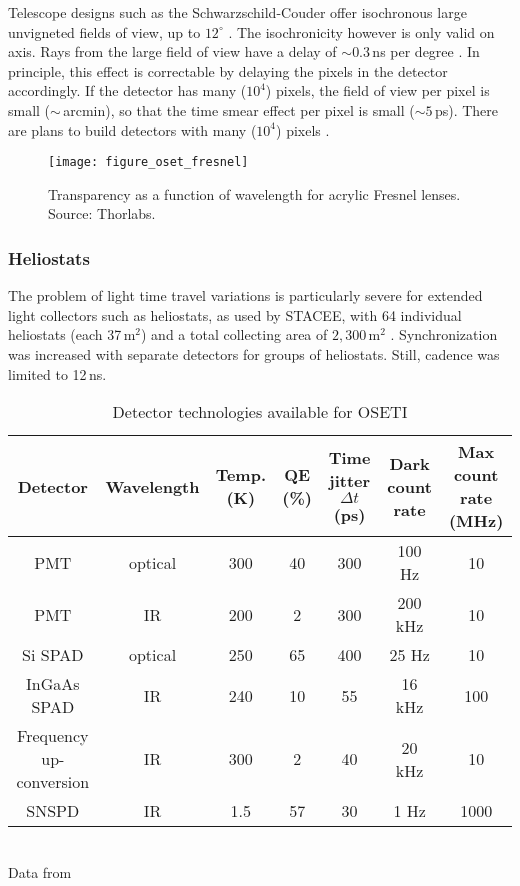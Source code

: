 \documentclass[twocolumn,tighten,longauthor]{myaastex62}
\begin{document}
Telescope designs such as the Schwarzschild-Couder \citep{1905MiGoe..10....1S} offer isochronous large unvigneted fields of view, up to $12^{\circ}$ \citep{Vassiliev2007,2008ICRC....3.1445V}. The isochronicity however is only valid on axis. Rays from the large field of view have a delay of $\sim0.3\,$ns per degree \citep[Figure 10 from][]{2007APh....28...10V}. In principle, this effect is correctable by delaying the pixels in the detector accordingly. If the detector has many ($10^4$) pixels, the field of view per pixel is small ($\sim$\,arcmin), so that the time smear effect per pixel is small ($\sim5\,$ps). There are plans to build detectors with many ($10^4$) pixels \citep{2011ExA....32..193A,2013APh....43....3A,2018arXiv180205715D}.


\begin{figure}
\texttt{[image: figure\_oset\_fresnel]}
\caption{\label{figure_oset_fresnel}Transparency as a function of wavelength for acrylic Fresnel lenses. Source: Thorlabs.}
\end{figure}

\subsubsection{Heliostats}
\label{sub:heliostats}
The problem of light time travel variations is particularly severe for extended light collectors such as heliostats, as used by STACEE, with 64 individual heliostats (each 37\,m$^2$) and a total collecting area of $2{,}300\,$m$^2$ \citep{2009AsBio...9..345H}. Synchronization was increased with separate detectors for groups of heliostats. Still, cadence was limited to 12\,ns.

\begin{table*}
\center
\caption{Detector technologies available for OSETI}
\label{tab:detector}
\begin{tabular}{ccccccc}
\hline
Detector &  Wavelength & Temp. (K) & QE (\%) & Time jitter $\Delta t$ (ps) & Dark count rate & Max count rate (MHz) \\
\hline
PMT                     & optical & 300 & 40 & 300 & 100 Hz  &    10 \\
PMT                     & IR      & 200 &  2 & 300 & 200 kHz &    10 \\
Si SPAD                 & optical & 250 & 65 & 400 &  25 Hz  &    10 \\
InGaAs SPAD             & IR      & 240 & 10 &  55 &  16 kHz &   100 \\
Frequency up-conversion & IR      & 300 &  2 &  40 &  20 kHz &    10 \\
SNSPD                   & IR      & 1.5 & 57 &  30 &   1 Hz  &  1000 \\
\hline
\end{tabular}
\\Data from \citet{Hadfield2009}
\end{table*}
\end{document}
